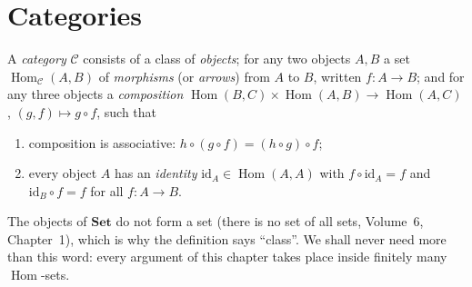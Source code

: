 \section{Categories}

\begin{definition}\label{def:category}
A \emph{category} $\mathcal C$ consists of a class of \emph{objects}; for any two objects $A,B$ a set $\operatorname{Hom}_{\mathcal C}(A,B)$ of \emph{morphisms} (or \emph{arrows}) from $A$ to $B$,
written $f\colon A\to B$; and for any three objects a \emph{composition} $\operatorname{Hom}(B,C)\times\operatorname{Hom}(A,B)\to\operatorname{Hom}(A,C)$, $(g,f)\mapsto g\circ f$, such that
\begin{enumerate}[label=(\roman*)]
\item composition is associative: $h\circ(g\circ f)=(h\circ g)\circ f$;
\item every object $A$ has an \emph{identity} $\mathrm{id}_A\in\operatorname{Hom}(A,A)$ with $f\circ\mathrm{id}_A=f$ and $\mathrm{id}_B\circ f=f$ for all $f\colon A\to B$.
\end{enumerate}
\end{definition}

The objects of $\mathbf{Set}$ do not form a set (there is no set of all sets, Volume~6, Chapter~1), which is why the definition says ``class''. We shall never need more than this
word: every argument of this chapter takes place inside finitely many $\operatorname{Hom}$-sets.

